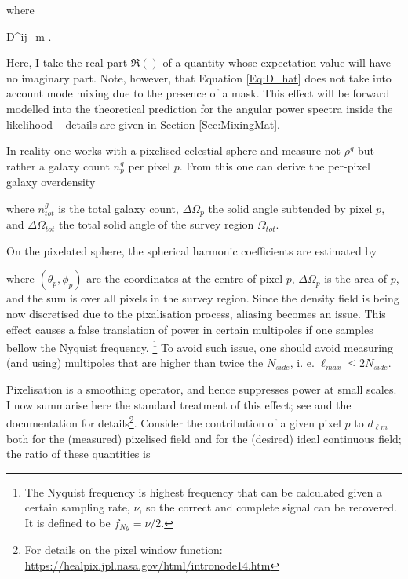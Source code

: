 \noindent where

 {
D^{ij}_{\ell m} \equiv {}.
}

\noindent Here, I take the real part $\Re()$ of a quantity whose expectation value will have no imaginary part. Note, however, that Equation \ref{Eq:D_hat} does not take into account mode mixing due to the presence of a mask. This effect will be forward modelled into the theoretical prediction for the angular power spectra inside the likelihood -- details are given in Section \ref{Sec:MixingMat}.

\qquad In reality one works with a pixelised celestial sphere and measure not $\rho^g$ but rather a galaxy count $n^g_p$ per pixel $p$. From this one can derive the per-pixel galaxy overdensity


\noindent where $n^g_{tot}$ is the total galaxy count, $\Delta \Omega_p$ the solid angle subtended by pixel $p$, and $\Delta \Omega_{tot}$ the total solid angle of the survey region $\Omega_{tot}$.

\qquad On the pixelated sphere, the spherical harmonic coefficients are estimated by


\noindent where $(\theta_p,\phi_p)$ are the coordinates at the centre of pixel $p$, $\Delta\Omega_p$ is the area of $p$, and the sum is over all pixels in the survey region. Since the density field is being now discretised due to the pixalisation process, aliasing becomes an issue. This effect causes a false translation of power in certain multipoles if one samples bellow the Nyquist frequency. \footnote{The Nyquist frequency is highest frequency that can be calculated given a certain sampling rate, $\nu$, so the correct and complete signal can be recovered. It is defined to be $f_{Ny} = \nu/2$.} To avoid such issue, one should avoid measuring (and using) multipoles that are higher than twice the $N_{side}$, i. e. $\ell_{max} \leq 2N_{side}$.

\qquad Pixelisation is a smoothing operator, and hence suppresses power at small scales. I now summarise here the standard treatment of this effect; see \cite{Healpix,Boris2013} and the \healpix documentation for details\footnote{For details on the pixel window function: \url{https://healpix.jpl.nasa.gov/html/intronode14.htm}}. Consider the contribution of a given pixel $p$ to $d_{\ell m}$ both for the (measured) pixelised field and for the (desired) ideal continuous field; the ratio of these quantities is 


